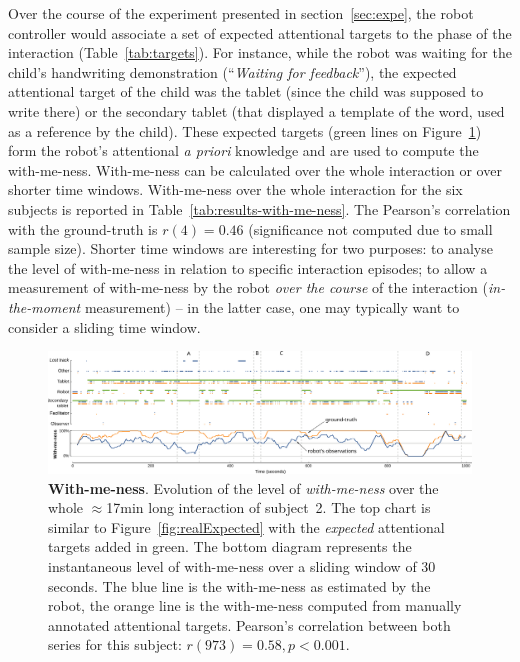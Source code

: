 \documentclass{sig-alternate}
\begin{document}
Over the course of the experiment presented in section~\ref{sec:expe}, the robot
controller would associate a set of expected attentional targets to the phase of
the interaction (Table~\ref{tab:targets}). For instance, while the robot was
waiting for the child's handwriting demonstration (``\textit{Waiting for
feedback}''), the expected attentional target of the child was the tablet (since
the child was supposed to write there) or the secondary tablet (that displayed a
template of the word, used as a reference by the child). These expected targets
(green lines on Figure~\ref{fig:with-me-ness}) form the robot's attentional {\it
a priori} knowledge and are used to compute the with-me-ness. With-me-ness can
be calculated over the whole interaction or over shorter time windows.
With-me-ness over the whole interaction for the six subjects is reported in
Table~\ref{tab:results-with-me-ness}. The Pearson's correlation with the
ground-truth is $r(4)=0.46$ (significance not computed due to small sample
size). Shorter time windows are interesting for two purposes: to analyse the
level of with-me-ness in relation to specific interaction episodes; to allow a
measurement of with-me-ness by the robot \emph{over the course} of the
interaction (\emph{in-the-moment} measurement) -- in the latter case, one may
typically want to consider a sliding time window.

\begin{figure}
    \centering
    \includegraphics[width=\linewidth]{with-me-ness}
    \caption{\small \textbf{With-me-ness}. Evolution of the level of
        \emph{with-me-ness} over the whole $\approx$17min long interaction of
        subject~2. The top chart is similar to Figure~\ref{fig:realExpected}
        with the \emph{expected} attentional targets added in green. The bottom
        diagram represents the instantaneous level of with-me-ness over a
        sliding window of 30 seconds. The blue line is the with-me-ness as estimated
        by the robot, the orange line is the with-me-ness computed from manually
        annotated attentional targets.  Pearson's correlation between both
        series for this subject: $r(973)=0.58, p < 0.001$.}

    \label{fig:with-me-ness}
\end{figure}
\end{document}
